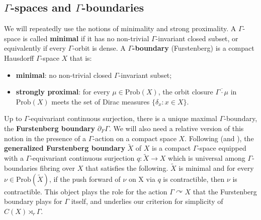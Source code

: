 \documentclass[12pt]{amsart} %
\theoremstyle{plain}
\theoremstyle{definition}
\begin{document}
\subsection{\texorpdfstring{$\Gamma$}{}-spaces and \texorpdfstring{$\Gamma$}{}-boundaries}
\label{subsec:GammaBoundary}
We will repeatedly use the notions of minimality and strong proximality. A $\Gamma$-space is called \textbf{minimal} if it has no non-trivial $\Gamma$-invariant closed subset, or equivalently if every $\Gamma$-orbit is dense. A \textbf{$\Gamma$-boundary} (Furstenberg) is a compact Hausdorff $\Gamma$-space $X$ that is:
\begin{itemize}
\item \textbf{minimal}: no non-trivial closed $\Gamma$-invariant subset;
\item \textbf{strongly proximal}: for every $\mu \in \mathrm{Prob}(X)$, the orbit closure $\overline{\Gamma\cdot\mu}$ in $\mathrm{Prob}(X)$ meets the set of Dirac measures $\{\delta_x : x \in X\}$.
\end{itemize}
Up to $\Gamma$-equivariant continuous surjection, there is a unique maximal $\Gamma$-boundary, the \textbf{Furstenberg boundary} $\partial_F \Gamma$.
We will also need a relative version of this notion in the presence of a $\Gamma$-action on a compact space $X$. Following \cite{kawabe2017uniformly} (and \cite{Naghavi}), the \textbf{generalized Furstenberg boundary} $\widetilde{X}$ of $X$ is a compact $\Gamma$-space equipped with a $\Gamma$-equivariant continuous surjection $q:\widetilde{X}\to X$ which is universal among $\Gamma$-boundaries fibring over $X$ that satisfies the following. $\widetilde{X}$ is minimal and for every $\nu\in\text{Prob}(\widetilde{X})$, if the push forward of $\nu$ on X via  $q$ is contractible, then $\nu$ is contractible. This object plays the role for the action $\Gamma\curvearrowright X$ that the Furstenberg boundary plays for $\Gamma$ itself, and underlies our criterion for simplicity of $C(X)\rtimes_r\Gamma$.
\end{document}
